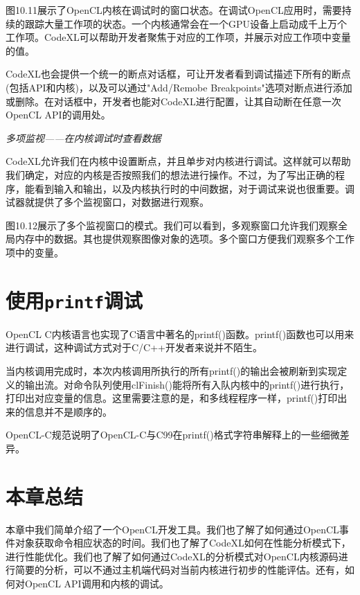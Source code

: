 图10.11展示了OpenCL内核在调试时的窗口状态。在调试OpenCL应用时，需要持续的跟踪大量工作项的状态。一个内核通常会在一个GPU设备上启动成千上万个工作项。CodeXL可以帮助开发者聚焦于对应的工作项，并展示对应工作项中变量的值。

CodeXL也会提供一个统一的断点对话框，可让开发者看到调试描述下所有的断点(包括API和内核)，以及可以通过"Add/Remobe Breakpoints"选项对断点进行添加或删除。在对话框中，开发者也能对CodeXL进行配置，让其自动断在任意一次OpenCL API的调用处。


\emph{多项监视——在内核调试时查看数据}

CodeXL允许我们在内核中设置断点，并且单步对内核进行调试。这样就可以帮助我们确定，对应的内核是否按照我们的想法进行操作。不过，为了写出正确的程序，能看到输入和输出，以及内核执行时的中间数据，对于调试来说也很重要。调试器就提供了多个监视窗口，对数据进行观察。

图10.12展示了多个监视窗口的模式。我们可以看到，多观察窗口允许我们观察全局内存中的数据。其也提供观察图像对象的选项。多个窗口方便我们观察多个工作项中的变量。




\section{使用\texttt{printf}调试}

OpenCL C内核语言也实现了C语言中著名的printf()函数。printf()函数也可以用来进行调试，这种调试方式对于C/C++开发者来说并不陌生。

当内核调用完成时，本次内核调用所执行的所有printf()的输出会被刷新到实现定义的输出流。对命令队列使用clFinish()能将所有入队内核中的printf()进行执行，打印出对应变量的信息。这里需要注意的是，和多线程程序一样，printf()打印出来的信息并不是顺序的。

OpenCL-C规范说明了OpenCL-C与C99在printf()格式字符串解释上的一些细微差异。



\section{本章总结}

本章中我们简单介绍了一个OpenCL开发工具。我们也了解了如何通过OpenCL事件对象获取命令相应状态的时间。我们也了解了CodeXL如何在性能分析模式下，进行性能优化。我们也了解了如何通过CodeXL的分析模式对OpenCL内核源码进行简要的分析，可以不通过主机端代码对当前内核进行初步的性能评估。还有，如何对OpenCL API调用和内核的调试。


